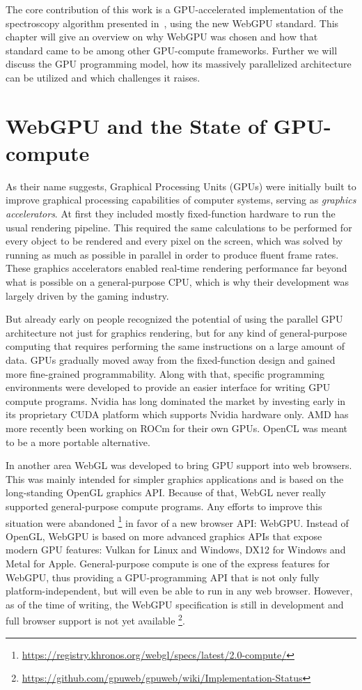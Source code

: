 The core contribution of this work is a GPU-accelerated implementation of the
spectroscopy algorithm presented in~\cite{bisping2023process},
using the new WebGPU standard.
This chapter will give an overview on why WebGPU was chosen and how that
standard came to be among other GPU-compute frameworks.
Further we will discuss the GPU programming model,
how its massively parallelized architecture can be utilized
and which challenges it raises.

\section{WebGPU and the State of GPU-compute}

As their name suggests, Graphical Processing Units (GPUs) were initially built
to improve graphical processing capabilities of computer systems,
serving as \emph{graphics accelerators}.
At first they included mostly fixed-function hardware to run the usual
rendering pipeline.
This required the same calculations to be performed for every object to
be rendered and every pixel on the screen,
which was solved by running as much as possible in parallel in order to produce
fluent frame rates.
These graphics accelerators enabled real-time rendering performance far beyond
what is possible on a general-purpose CPU,
which is why their development was largely driven by the gaming industry.

But already early on people recognized the potential of using the parallel
GPU architecture not just for graphics rendering,
but for any kind of general-purpose computing that requires performing the same
instructions on a large amount of data.
GPUs gradually moved away from the fixed-function design and gained more
fine-grained programmability.
Along with that, specific programming environments were
developed to provide an easier interface for writing GPU compute programs.
Nvidia has long dominated the market by investing early in its
proprietary CUDA platform which supports Nvidia hardware only.
AMD has more recently been working on ROCm for their own GPUs.
OpenCL was meant to be a more portable alternative.

In another area WebGL was developed to bring GPU support into web browsers.
This was mainly intended for simpler graphics applications and is based on the
long-standing OpenGL graphics API\@.
Because of that, WebGL never really supported general-purpose compute programs.
Any efforts to improve this situation were abandoned%
\footnote{\url{https://registry.khronos.org/webgl/specs/latest/2.0-compute/}}
in favor of a new browser API\@: WebGPU\@.
Instead of OpenGL, WebGPU is based on more advanced graphics APIs
that expose modern GPU features:
Vulkan for Linux and Windows, DX12 for Windows and Metal for Apple.
General-purpose compute is one of the express features for WebGPU,
thus providing a GPU-programming API that is not only fully
platform-independent, but will even be able to run in any web browser.
However, as of the time of writing, the WebGPU specification is still in
development and full browser support is not yet available%
\footnote{\url{https://github.com/gpuweb/gpuweb/wiki/Implementation-Status}}.

